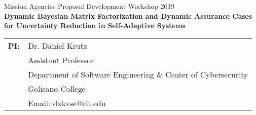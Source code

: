 \documentclass[12pt]{article}
\newcommand{\Title}{Dynamic Bayesian Matrix Factorization and Dynamic Assurance Cases for Uncertainty Reduction in Self-Adaptive Systems}
\newcommand{\CallNumber}{Mission Agencies Proposal Development Workshop 2019}
\newcommand{\CallName}{BBBB}
\begin{document}
\begin{titlepage}

\newcommand{\HRule}{\rule{\linewidth}{0.3mm}} %




\noindent\large \CallNumber\\[.20cm] %

\noindent \LARGE \textbf{\Title}\\[.10cm] %





\begin{tabular}{ L{15mm} L{120mm} }






\normalsize \textbf{PI:} & \normalsize  Dr. Daniel Krutz \\
    & \vspace{-6mm} \normalsize Assistant Professor \\
    & \vspace{-12mm} \normalsize Department of Software Engineering \& Center of Cybersecurity
 \\
   & \vspace{-18mm} \normalsize Golisano College \\
   & \vspace{-24mm} \normalsize Email: dxkvse@rit.edu \\



\end{tabular}
\end{titlepage}
\end{document}
